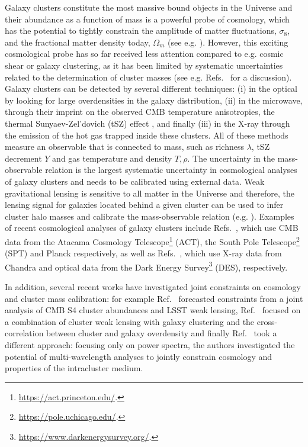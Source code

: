 \documentclass[%
 reprint,
nofootinbib,
 amsmath,amssymb,
 aps,
]{revtex4-1}
\begin{document}
Galaxy clusters constitute the most massive bound objects in the Universe and their abundance as a function of mass is a powerful probe of cosmology, which has the potential to tightly constrain the amplitude of matter fluctuations, $\sigma_{8}$, and the fractional matter density today, $\Omega_{m}$ (see e.g. \cite{Voit:2005, Allen:2011}). However, this exciting cosmological probe has so far received less attention compared to e.g. cosmic shear or galaxy clustering, as it has been limited by systematic uncertainties related to the determination of cluster masses (see e.g. Refs.~\cite{Carlstrom:2002, Voit:2005, Allen:2011} for a discussion). Galaxy clusters can be detected by several different techniques: (i) in the optical by looking for large overdensities in the galaxy distribution, (ii) in the microwave, through their imprint on the observed CMB temperature anisotropies, the  thermal Sunyaev-Zel'dovich (tSZ) effect \cite{Sunyaev:1970}, and finally (iii) in the X-ray through the emission of the hot gas trapped inside these clusters. All of these methods measure an observable that is connected to mass, such as richness $\lambda$, tSZ decrement $Y$ and gas temperature and density $T, \rho$. The uncertainty in the  mass-observable relation is the largest systematic uncertainty in cosmological analyses of galaxy clusters and needs to be calibrated using external data. Weak gravitational lensing is sensitive to all  matter in the Universe and therefore, the lensing signal for galaxies located behind a given cluster can be used to infer cluster halo masses and calibrate the mass-observable relation (e.g. \cite{Allen:2011}). Examples of recent cosmological analyses of galaxy clusters include Refs.~\cite{Hasselfield:2013, Bocquet:2019, Planck:2016XXIV, Zubeldia:2019}, which use CMB data from the Atacama Cosmology Telescope\footnote{\url{https://act.princeton.edu/}.} (ACT), the South Pole Telescope\footnote{\url{https://pole.uchicago.edu/}.} (SPT) and Planck respectively, as well as Refs.~\cite{Mantz:2014, Abbott:2020}, which use X-ray data from Chandra and optical data from the Dark Energy Survey\footnote{\url{https://www.darkenergysurvey.org/}.} (DES), respectively.

In addition, several recent works have investigated joint constraints on cosmology and cluster mass calibration: for example Ref.~\cite{Madhavacheril:2017} forecasted constraints from a joint analysis of CMB S4 cluster abundances and LSST weak lensing, Ref.~\cite{Salcedo:2020} focused on a combination of cluster weak lensing with galaxy clustering and the cross-correlation between cluster and galaxy overdensity and finally Ref.~\cite{Shirasaki:2020} took a different approach: focusing only on power spectra, the authors investigated the potential of multi-wavelength analyses to jointly constrain cosmology and properties of the intracluster medium.
\end{document}

